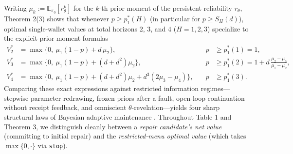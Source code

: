 \documentclass[11pt,a4paper]{article}
\begin{document}
Writing \(\mu_k := \mathbb{E}_{\pi_0}[r_\theta^k]\) for the \(k\)-th
prior moment of the persistent reliability \(r_\theta\), Theorem 2(3)
shows that whenever \(p \ge p_1^*(H)\) (in particular for
\(p \ge S_H(d)\)), optimal single-wallet values at total horizons \(2\),
\(3\), and \(4\) (\(H = 1, 2, 3\)) specialize to the explicit
prior-moment formulas \[\begin{aligned}
V_2^* &= \max\bigl\{0,\ \mu_1(1 - p) + d\,\mu_2\bigr\}, &\quad p &\ge p_1^*(1) = 1, \\
V_3^* &= \max\bigl\{0,\ \mu_1(1 - p) + (d + d^2)\mu_2\bigr\}, &\quad p &\ge p_1^*(2) = 1 + d\,\frac{\mu_2 - \mu_3}{\mu_1 - \mu_2}, \\
V_4^* &= \max\bigl\{0,\ \mu_1(1 - p) + (d + d^2)\mu_2 + d^3(2\mu_3 - \mu_4)\bigr\}, &\quad p &\ge p_1^*(3).
\end{aligned}\] Comparing these exact expressions against restricted
information regimes---stepwise parameter redrawing, frozen priors after
a fault, open-loop continuation without receipt feedback, and omniscient
\(\theta\)-revelation---yields four sharp structural laws of Bayesian
adaptive maintenance
\citep{blackwell1953, howard1966, easleyKiefer1988, aghion1991, ross2011}.
Throughout Table 1 and Theorem 3, we distinguish cleanly between a
\emph{repair candidate's net value} (committing to initial repair) and
the \emph{restricted-menu optimal value} (which takes
\(\max\{0, \cdot\}\) via \texttt{stop}).

\end{document}
